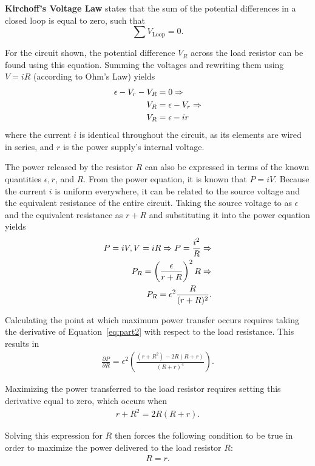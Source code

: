 \documentclass[twocolumn,english]{IEEEtran}
\theoremstyle{plain}
\theoremstyle{plain}
\begin{document}
\textbf{Kirchoff's Voltage Law} states that the sum of the potential differences in a closed loop is equal to zero, such that
\begin{equation*}
 \sum V_{\text{Loop}} = 0.
\end{equation*}

For the circuit shown, the potential difference $V_R$ across the load resistor can be found using this equation. Summing the voltages and rewriting them using $V=iR$ (according to Ohm's Law) yields
\begin{align}\label{eq:part1}
 \epsilon - V_{r} - V_R &= 0 	\Rightarrow \notag \\
 V_R &= \epsilon - V_r 		\Rightarrow \notag \\
 V_R &= \epsilon - ir
\end{align}
where the current $i$ is identical throughout the circuit, as its elements are wired in series, and $r$ is the power supply's internal voltage.

The power released by the resistor $R$ can also be expressed in terms of the known quantities $\epsilon, r$, and $R$. From the power equation, it is known that $P=iV$. Because the current $i$ is uniform everywhere, it can be related to the source voltage and the equivalent resistance of the entire circuit. Taking the source voltage to as $\epsilon$ and the equivalent resistance as $r+R$ and substituting it into the power equation yields
\begin{align}\label{eq:part2}
 P = iV, V = iR \Rightarrow P = \frac{i^2}{R} 	\Rightarrow \notag 	\\
 P_R = \left(\frac{\epsilon}{r+R}\right)^2 R 	\Rightarrow \notag	\\
 P_R = \epsilon^2 \frac{R}{(r+R)^2}.
\end{align}

Calculating the point at which maximum power transfer occurs requires taking the derivative of Equation~\ref{eq:part2} with respect to the load resistance. This results in
\begin{align*}
 \frac{\partial P}{\partial R} = \epsilon^2 \left(\frac{(r+R^2)-2R(R+r)}{(R+r)^4}\right).
\end{align*}

Maximizing the power transferred to the load resistor requires setting this derivative equal to zero, which occurs when
\begin{align*}
 r+R^2 = 2R(R+r).
\end{align*}

Solving this expression for $R$ then forces the following condition to be true in order to maximize the power delivered to the load resistor $R$:
\begin{align}
 R=r.
\end{align}
\end{document}
